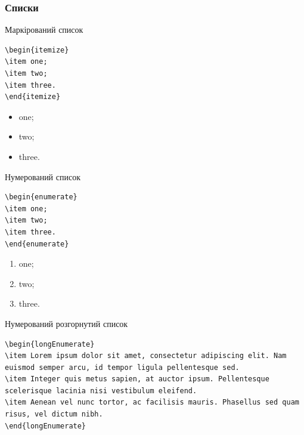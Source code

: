\subsubsection{Списки}

Маркірований список

\begin{lstlisting}
\begin{itemize}
\item one;
\item two;
\item three.
\end{itemize}
\end{lstlisting}

\begin{itemize}
\item one;
\item two;
\item three.
\end{itemize}

Нумерований список

\begin{lstlisting}
\begin{enumerate}
\item one;
\item two;
\item three.
\end{enumerate}
\end{lstlisting}

\begin{enumerate}
\item one;
\item two;
\item three.
\end{enumerate}

Нумерований розгорнутий список

\begin{lstlisting}
\begin{longEnumerate}
\item Lorem ipsum dolor sit amet, consectetur adipiscing elit. Nam euismod semper arcu, id tempor ligula pellentesque sed. 
\item Integer quis metus sapien, at auctor ipsum. Pellentesque scelerisque lacinia nisi vestibulum eleifend. 
\item Aenean vel nunc tortor, ac facilisis mauris. Phasellus sed quam risus, vel dictum nibh.
\end{longEnumerate}
\end{lstlisting}

